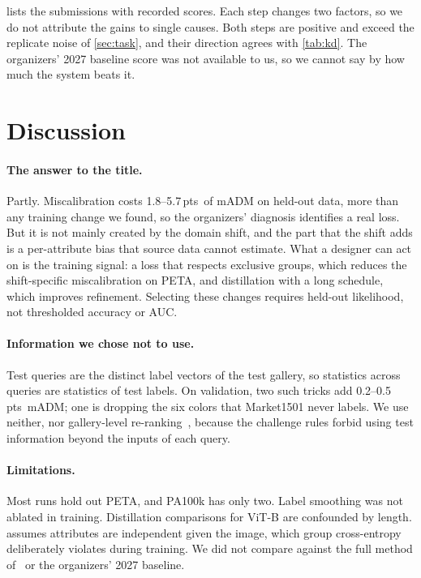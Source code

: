 \documentclass[10pt,twocolumn,letterpaper]{article}
\newcommand{\pts}{\,pts}
\begin{document}
 lists the submissions with recorded scores. Each step changes two factors, so we do not attribute the gains to single causes. Both steps are positive and exceed the replicate noise of \cref{sec:task}, and their direction agrees with \cref{tab:kd}. The organizers' 2027 baseline score was not available to us, so we cannot say by how much the system beats it.

\section{Discussion}
\label{sec:disc}

\paragraph{The answer to the title.} Partly. Miscalibration costs 1.8--5.7\pts\ of mADM on held-out data, more than any training change we found, so the organizers' diagnosis identifies a real loss. But it is not mainly created by the domain shift, and the part that the shift adds is a per-attribute bias that source data cannot estimate. What a designer can act on is the training signal: a loss that respects exclusive groups, which reduces the shift-specific miscalibration on PETA, and distillation with a long schedule, which improves refinement. Selecting these changes requires held-out likelihood, not thresholded accuracy or AUC.

\paragraph{Information we chose not to use.} Test queries are the distinct label vectors of the test gallery, so statistics across queries are statistics of test labels. On validation, two such tricks add 0.2--0.5\pts\ mADM; one is dropping the six colors that Market1501 never labels. We use neither, nor gallery-level re-ranking~\cite{kreciprocal}, because the challenge rules forbid using test information beyond the inputs of each query.

\paragraph{Limitations.} Most runs hold out PETA, and PA100k has only two. Label smoothing was not ablated in training. Distillation comparisons for ViT-B are confounded by length.  assumes attributes are independent given the image, which group cross-entropy deliberately violates during training. We did not compare against the full method of~\cite{specker21} or the organizers' 2027 baseline.
\end{document}
